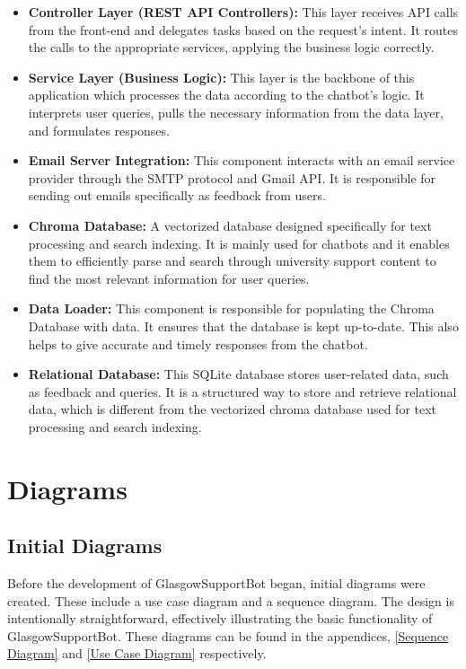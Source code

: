 \documentclass{l4proj}
\begin{document}
\begin{itemize}
    \item \textbf{Controller Layer (REST API Controllers):} This layer receives API calls from the front-end and delegates tasks based on the request's intent. It routes the calls to the appropriate services, applying the business logic correctly.
    
    \item \textbf{Service Layer (Business Logic):} This layer is the backbone of this application which processes the data according to the chatbot's logic. It interprets user queries, pulls the necessary information from the data layer, and formulates responses.
    
    \item \textbf{Email Server Integration:} This component interacts with an email service provider through the SMTP protocol and Gmail API. It is responsible for sending out emails specifically as feedback from users.
    
    \item \textbf{Chroma Database:} A vectorized database designed specifically for text processing and search indexing. It is mainly used for chatbots and it enables them to efficiently parse and search through university support content to find the most relevant information for user queries.
    
    \item \textbf{Data Loader:} This component is responsible for populating the Chroma Database with data. It ensures that the database is kept up-to-date. This also helps to give accurate and timely responses from the chatbot.
    
    \item \textbf{Relational Database:}  This SQLite database stores user-related data, such as feedback and queries. It is a structured way to store and retrieve relational data, which is different from the vectorized chroma database used for text processing and search indexing.
\end{itemize}
\section{Diagrams}

\subsection{Initial Diagrams}

Before the development of GlasgowSupportBot began, initial diagrams were created. These include a use case diagram and a sequence diagram. The design is intentionally straightforward, effectively illustrating the basic functionality of GlasgowSupportBot. These diagrams can be found in the appendices, \ref{Sequence Diagram} and \ref{Use Case Diagram} respectively.
\end{document}

